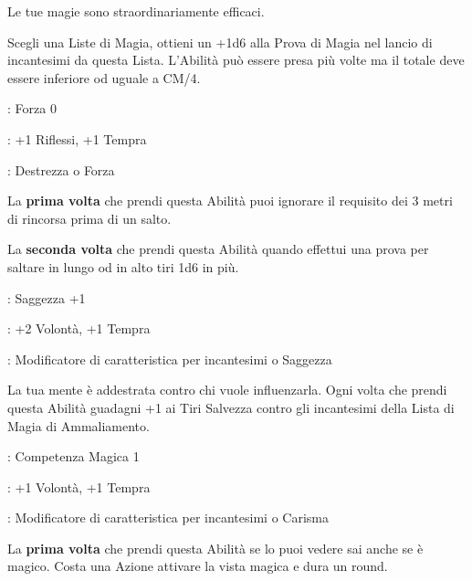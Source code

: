 \begin{multicols}{2}
Le tue magie sono straordinariamente efficaci.

Scegli una Liste di Magia, ottieni un +1d6 alla Prova di Magia nel lancio di incantesimi da questa Lista. L'Abilità può essere presa più volte ma il totale deve essere inferiore od uguale a CM/4.

\begin{description}[noitemsep, topsep=0pt, parsep=0pt, partopsep=0pt, leftmargin=0cm, labelwidth=2.5cm]
    \item[\textbf{Requisito}]: Forza 0
    \item[\textbf{Tiri Salvezza}]: +1 Riflessi, +1 Tempra
    \item[\textbf{Caratteristica}]: Destrezza o Forza
\end{description}

La \textbf{prima volta} che prendi questa Abilità puoi ignorare il requisito dei 3 metri di rincorsa prima di un salto.

La \textbf{seconda volta} che prendi questa Abilità quando effettui una prova per saltare in lungo od in alto tiri 1d6 in più.

\begin{description}[noitemsep, topsep=0pt, parsep=0pt, partopsep=0pt, leftmargin=0cm, labelwidth=2.5cm]
    \item[\textbf{Requisito}]: Saggezza +1
    \item[\textbf{Tiri Salvezza}]: +2 Volontà, +1 Tempra
    \item[\textbf{Caratteristica}]: Modificatore di caratteristica per incantesimi o Saggezza
\end{description}

La tua mente è addestrata contro chi vuole influenzarla. Ogni volta che prendi questa Abilità guadagni +1 ai Tiri Salvezza contro gli incantesimi della Lista di Magia di Ammaliamento.

\begin{description}[noitemsep, topsep=0pt, parsep=0pt, partopsep=0pt, leftmargin=0cm, labelwidth=2.5cm]
    \item[\textbf{Requisito}]: Competenza Magica 1
    \item[\textbf{Tiri Salvezza}]: +1 Volontà, +1 Tempra
    \item[\textbf{Caratteristica}]: Modificatore di caratteristica per incantesimi o Carisma
\end{description}

La \textbf{prima volta} che prendi questa Abilità se lo puoi vedere sai anche se è magico. Costa una Azione attivare la vista magica e dura un round.


\end{multicols}
